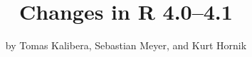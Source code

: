 \title{Changes in R 4.0--4.1}
\author{by Tomas Kalibera, Sebastian Meyer, and Kurt Hornik}

\maketitle

\begin{verbatim}
\end{verbatim}


\address{%
Tomas Kalibera\\
\\%
\\
%
%
%
%
}

\address{%
Sebastian Meyer\\
\\%
\\
%
%
%
%
}

\address{%
Kurt Hornik\\
\\%
\\
%
%
%
%
}
